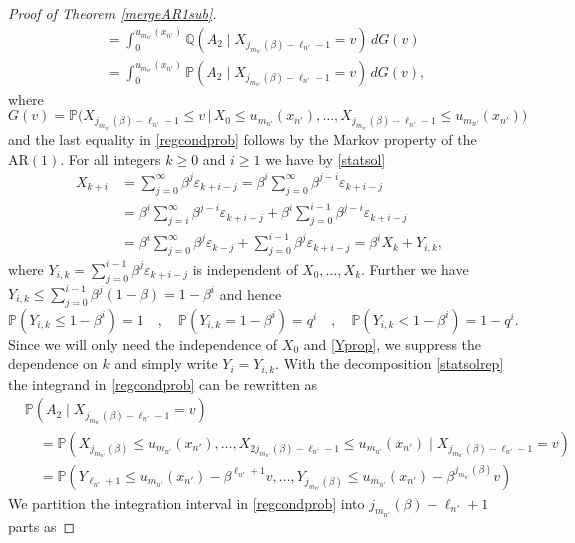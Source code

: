 \documentclass[12pt]{amsart}
\theoremstyle{definition}
\theoremstyle{remark}
\newcommand{\AR}{\operatorname{AR(1)}}
\newcommand{\eps}{{\varepsilon}}
\newcommand{\Pm}{{\mathbb P}}
\newcommand{\Qm}{{\mathbb Q}}
\numberwithin{equation}{section}
\begin{document}
\begin{proof}[Proof of Theorem \ref{mergeAR1sub}]
\begin{equation}
\begin{split}
& =\int_0^{u_{m_{n'}}(x_{n'})}\Qm(A_2\mid X_{j_{m_{n'}}(\beta)-\ell_{n'}-1}=v)\,dG(v)\\
& =\int_0^{u_{m_{n'}}(x_{n'})}\Pm(A_2\mid X_{j_{m_{n'}}(\beta)-\ell_{n'}-1}=v)\,dG(v),
\end{split}\end{equation}
where
$$G(v)=\Pm\big(X_{j_{m_{n'}}(\beta)-\ell_{n'}-1}\leq v\,\big|\,X_0\leq u_{m_{n'}}(x_{n'}),\ldots,X_{j_{m_{n'}}(\beta)-\ell_{n'}-1}\leq u_{m_{n'}}(x_{n'})\big)$$
and the last equality in \eqref{regcondprob} follows by the Markov property of the $\AR$. For all integers $k\geq0$ and $i\geq1$ we have by \eqref{statsol}
\begin{equation}\label{statsolrep}\begin{split}
X_{k+i} & =\sum_{j=0}^\infty \beta^j \eps_{k+i-j}=\beta^i\sum_{j=0}^\infty \beta^{j-i} \eps_{k+i-j}\\
& =\beta^i\sum_{j=i}^\infty \beta^{j-i} \eps_{k+i-j}+\beta^i\sum_{j=0}^{i-1} \beta^{j-i} \eps_{k+i-j}\\
& =\beta^i\sum_{j=0}^\infty \beta^{j} \eps_{k-j}+\sum_{j=0}^{i-1} \beta^{j} \eps_{k+i-j}=\beta^i X_k+Y_{i,k},
\end{split}\end{equation}
where $Y_{i,k}=\sum_{j=0}^{i-1} \beta^{j} \eps_{k+i-j}$ is independent of $X_0,\ldots,X_k$.
Further we have $Y_{i,k}\leq\sum_{j=0}^{i-1} \beta^{j}(1-\beta)=1-\beta^i$ and hence
\begin{equation}\label{Yprop}
\Pm(Y_{i,k}\leq1-\beta^i)=1\quad,\quad\Pm(Y_{i,k}=1-\beta^i)=q^i\quad,\quad\Pm(Y_{i,k}<1-\beta^i)=1-q^i.
\end{equation}
Since we will only need the independence of $X_0$ and \eqref{Yprop}, we suppress the dependence on $k$ and simply write $Y_i=Y_{i,k}$. With the decomposition \eqref{statsolrep} the integrand in \eqref{regcondprob} can be rewritten as
\begin{equation}\label{regcond2}\begin{split}
& \Pm(A_2\mid X_{j_{m_{n'}}(\beta)-\ell_{n'}-1}=v)\\
& \quad=\Pm(X_{j_{m_{n'}}(\beta)}\leq u_{m_{n'}}(x_{n'}),\ldots,X_{2j_{m_{n'}}(\beta)-\ell_{n'}-1}\leq u_{m_{n'}}(x_{n'})\mid X_{j_{m_{n'}}(\beta)-\ell_{n'}-1}=v)\\
& \quad=\Pm(Y_{\ell_{n'}+1}\leq u_{m_{n'}}(x_{n'})-\beta^{\ell_{n'}+1}v,\ldots,Y_{j_{m_{n'}}(\beta)}\leq u_{m_{n'}}(x_{n'})-\beta^{j_{m_{n'}}(\beta)}v)
\end{split}\end{equation}
We partition the integration interval in \eqref{regcondprob} into $j_{m_{n'}}(\beta)-\ell_{n'}+1$ parts as

\end{proof}
\end{document}
